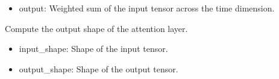 \documentclass[letterpaper,10pt,english]{sphinxmanual}
\begin{document}
\begin{fulllineitems}
\begin{fulllineitems}
\begin{description}
\begin{itemize}
\end{itemize}

\begin{itemize}
\item {} 
\sphinxAtStartPar
output: Weighted sum of the input tensor across the time dimension.

\end{itemize}

\end{description}

\end{fulllineitems}


\begin{fulllineitems}
\label{\detokenize{lstm_results_real_data:lstm_results_real_data.AttentionLayer.compute_output_shape}}
\pysigstartsignatures
{}
\pysigstopsignatures
\sphinxAtStartPar
Compute the output shape of the attention layer.
\begin{description}
\begin{itemize}
\item {} 
\sphinxAtStartPar
input\_shape: Shape of the input tensor.

\end{itemize}

\begin{itemize}
\item {} 
\sphinxAtStartPar
output\_shape: Shape of the output tensor.

\end{itemize}

\end{description}

\end{fulllineitems}


\end{fulllineitems}

\end{document}
